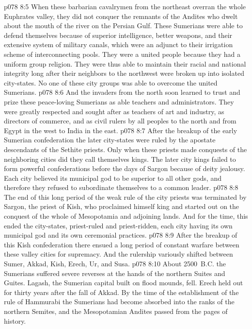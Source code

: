 \vs p078 8:5 When these barbarian cavalrymen from the northeast overran the whole Euphrates valley, they did not conquer the remnants of the Andites who dwelt about the mouth of the river on the Persian Gulf. These Sumerians were able to defend themselves because of superior intelligence, better weapons, and their extensive system of military canals, which were an adjunct to their irrigation scheme of interconnecting pools. They were a united people because they had a uniform group religion. They were thus able to maintain their racial and national integrity long after their neighbors to the northwest were broken up into isolated city\hyp{}states. No one of these city groups was able to overcome the united Sumerians.
\vs p078 8:6 And the invaders from the north soon learned to trust and prize these peace\hyp{}loving Sumerians as able teachers and administrators. They were greatly respected and sought after as teachers of art and industry, as directors of commerce, and as civil rulers by all peoples to the north and from Egypt in the west to India in the east.
\vs p078 8:7 After the breakup of the early Sumerian confederation the later city\hyp{}states were ruled by the apostate descendants of the Sethite priests. Only when these priests made conquests of the neighboring cities did they call themselves kings. The later city kings failed to form powerful confederations before the days of Sargon because of deity jealousy. Each city believed its municipal god to be superior to all other gods, and therefore they refused to subordinate themselves to a common leader.
\vs p078 8:8 The end of this long period of the weak rule of the city priests was terminated by Sargon, the priest of Kish, who proclaimed himself king and started out on the conquest of the whole of Mesopotamia and adjoining lands. And for the time, this ended the city\hyp{}states, priest\hyp{}ruled and priest\hyp{}ridden, each city having its own municipal god and its own ceremonial practices.
\vs p078 8:9 After the breakup of this Kish confederation there ensued a long period of constant warfare between these valley cities for supremacy. And the rulership variously shifted between Sumer, Akkad, Kish, Erech, Ur, and Susa.
\vs p078 8:10 About 2500~B.C. the Sumerians suffered severe reverses at the hands of the northern Suites and Guites. Lagash, the Sumerian capital built on flood mounds, fell. Erech held out for thirty years after the fall of Akkad. By the time of the establishment of the rule of Hammurabi the Sumerians had become absorbed into the ranks of the northern Semites, and the Mesopotamian Andites passed from the pages of history.
